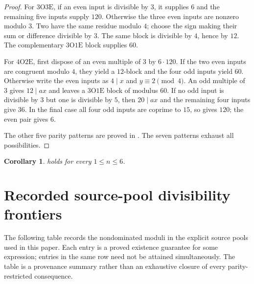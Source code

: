 \documentclass[11pt]{amsart}
\newtheorem{corollary}[theorem]{Corollary}
\theoremstyle{definition}
\theoremstyle{remark}
\newcommand{\OO}{\mathrm O}
\newcommand{\EE}{\mathrm E}
\begin{document}
\begin{proof}
For $3\OO3\EE$, if an even input is divisible by $3$, it supplies $6$ and
the remaining five inputs supply $120$.  Otherwise the three even inputs are
nonzero modulo $3$.  Two have the same residue modulo $4$; choose the sign
making their sum or difference divisible by $3$.  The same block is
divisible by $4$, hence by $12$.  The complementary $3\OO1\EE$ block
supplies $60$.

For $4\OO2\EE$, first dispose of an even multiple of $3$ by
$6\cdot120$.  If the two even inputs are congruent modulo $4$, they yield a
$12$-block and the four odd inputs yield $60$.  Otherwise write the even
inputs as $4\mid x$ and $y\equiv2\pmod4$.  An odd multiple of $3$ gives
$12\mid ax$ and leaves a $3\OO1\EE$ block of modulus $60$.  If no odd input
is divisible by $3$ but one is divisible by $5$, then $20\mid ax$ and the
remaining four inputs give $36$.  In the final case all four odd inputs are
coprime to $15$, so  gives $120$; the even pair gives
$6$.

The other five parity patterns are proved in
.  The seven patterns
exhaust all possibilities.
\end{proof}

\begin{corollary}\label{cor:n6}
 holds for every $1\le n\le6$.
\end{corollary}

\section{Recorded source-pool divisibility frontiers}

The following table records the nondominated moduli in the explicit source
pools used in this paper.  Each entry is a proved existence guarantee for
some expression; entries in the same row need not be attained simultaneously.
The table is a provenance summary rather than an exhaustive closure of every
parity-restricted consequence.
\end{document}
